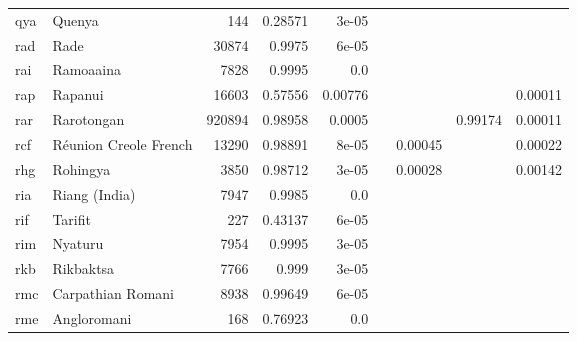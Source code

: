 \documentclass[11pt]{article}
\begin{document}
\begin{table*}[h]
{\begin{tabular}{llrrrrrrr}
qya         & Quenya         & 144         & 0.28571         & 3e-05         &          &          &          &          \\

rad         & Rade         & 30874         & 0.9975         & 6e-05         &          &          &          &          \\

rai         & Ramoaaina         & 7828         & 0.9995         & 0.0         &          &          &          &          \\

rap         & Rapanui         & 16603         & 0.57556         & 0.00776         &          &          &          & 0.00011         \\

rar         & Rarotongan         & 920894         & 0.98958         & 0.0005         &          &          & 0.99174         & 0.00011         \\

rcf         & Réunion Creole French         & 13290         & 0.98891         & 8e-05         &          & 0.00045         &          & 0.00022         \\

rhg         & Rohingya         & 3850         & 0.98712         & 3e-05         &          & 0.00028         &          & 0.00142         \\

ria         & Riang (India)         & 7947         & 0.9985         & 0.0         &          &          &          &          \\

rif         & Tarifit         & 227         & 0.43137         & 6e-05         &          &          &          &          \\

rim         & Nyaturu         & 7954         & 0.9995         & 3e-05         &          &          &          &          \\

rkb         & Rikbaktsa         & 7766         & 0.999         & 3e-05         &          &          &          &          \\

rmc         & Carpathian Romani         & 8938         & 0.99649         & 6e-05         &          &          &          &          \\

rme         & Angloromani         & 168         & 0.76923         & 0.0         &          &          &          &          \\


\end{tabular}}
\end{table*}
\end{document}
